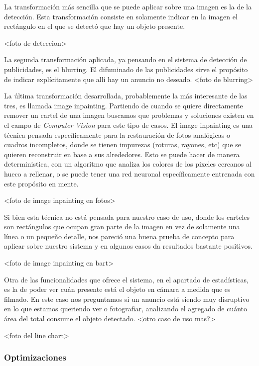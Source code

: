 \documentclass[a4paper]{article}
\begin{document}
La transformación más sencilla que se puede aplicar sobre una imagen es la de la detección. Esta transformación consiste en solamente indicar en la imagen el rectángulo en el que se detectó que hay un objeto presente.

<foto de deteccion>

La segunda transformación aplicada, ya pensando en el sistema de detección de publicidades, es el blurring. El difuminado de las publicidades sirve el propósito de indicar explícitamente que allí hay un anuncio no deseado.
<foto de blurring>

La última transformación desarrollada, probablemente la más interesante de las tres, es llamada image inpainting. Partiendo de cuando se quiere directamente remover un cartel de una imagen buscamos que problemas y soluciones existen en el campo de \textit{Computer Vision} para este tipo de casos. El image inpainting es una técnica pensada específicamente para la restauración de fotos analógicas o cuadros incompletos, donde se tienen impurezas (roturas, rayones, etc) que se quieren reconstruir en base a sus alrededores. Esto se puede hacer de manera deterministica, con un algoritmo que analiza los colores de los pixeles cercanos al hueco a rellenar, o se puede tener una red neuronal específicamente entrenada con este propósito en mente.

<foto de image inpainting en fotos>

Si bien esta técnica no está pensada para nuestro caso de uso, donde los carteles son rectángulos que ocupan gran parte de la imagen en vez de solamente una línea o un pequeño detalle, nos pareció una buena prueba de concepto para aplicar sobre nuestro sistema y en algunos casos da resultados bastante positivos.

<foto de image inpainting en bart>

Otra de las funcionalidades que ofrece el sistema, en el apartado de estadísticas, es la de poder ver cuán presente está el objeto en cámara a medida que es filmado. En este caso nos preguntamos si un anuncio está siendo muy disruptivo en lo que estamos queriendo ver o fotografiar, analizando el agregado de cuánto área del total consume el objeto detectado. <otro caso de uso mas?>

<foto del line chart>

\subsubsection{Optimizaciones}
\end{document}
